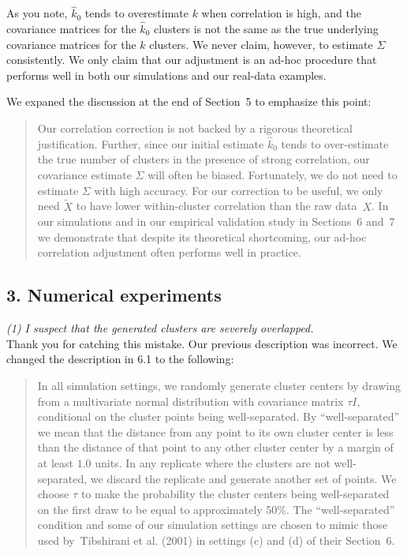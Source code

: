 \documentclass[11pt]{article}
\begin{document}
As you note, $\hat{k}_0$ tends to overestimate $k$ when correlation is high,
and the covariance matrices for the  $\hat{k}_0$ clusters is not the same as
the true underlying covariance matrices for the $k$ clusters. We never claim,
however, to estimate $\Sigma$ consistently. We only claim that our adjustment
is an ad-hoc procedure that performs well in both our simulations and our
real-data examples.

We expaned the discussion at the end of Section~5 to emphasize this point:

\begin{quote}
Our correlation correction is not backed by a rigorous theoretical
justification. Further, since our initial estimate $\hat k_0$ tends to
over-estimate the true number of clusters in the presence of strong
correlation, our covariance estimate $\hat \Sigma$ will often be biased.
Fortunately, we do not need to estimate $\Sigma$ with high accuracy. For our
correction to be useful, we only need $\tilde{X}$ to have lower within-cluster
correlation than the raw data~$X$. In our simulations and in our empirical
validation study in Sections~6 and~7 we demonstrate that despite its
theoretical shortcoming, our ad-hoc correlation adjustment often performs well
in practice.
\end{quote}


\subsection{3. Numerical experiments}

\noindent
\emph{(1) I suspect that the generated clusters are severely overlapped.}
\\

Thank you for catching this mistake. Our previous description was
incorrect. We changed the description in 6.1 to the following:

\begin{quote}
In all simulation settings, we randomly generate cluster centers by drawing
from a multivariate normal distribution with covariance matrix $\tau I$,
conditional on the cluster points being well-separated. By ``well-separated''
we mean that the distance from any point to its own cluster center is less
than the distance of that point to any other cluster center by a margin of at
least $1.0$ units. In any replicate where the clusters are not well-separated,
we discard the replicate and generate another set of points.  We choose $\tau$
to make the probability the cluster centers being well-separated on the first
draw to be equal to approximately 50\%.  The ``well-separated'' condition and
some of our simulation settings are chosen to mimic those used by~Tibshirani
et al. (2001) in settings (c) and (d) of their Section~6.
\end{quote}
\end{document}
